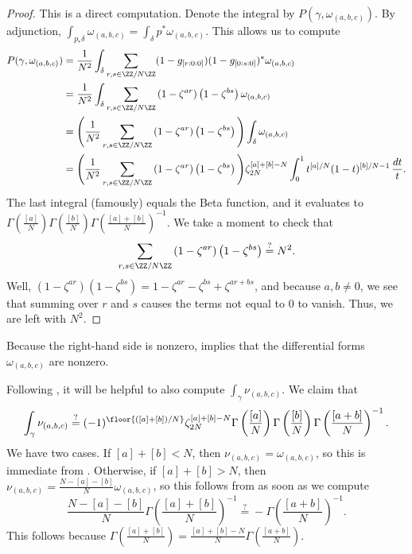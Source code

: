 \documentclass[../thesis.tex]{subfiles}
\begin{document}
\begin{proof}
	This is a direct computation. Denote the integral by $P(\gamma,\omega_{(a,b,c)})$. By adjunction, $\int_{p_*\delta}\omega_{(a,b,c)}=\int_\delta p^*\omega_{(a,b,c)}$. This allows us to compute
	\begin{align*}
		P(\gamma,\omega_{(a,b,c)}) &= \frac1{N^2}\int_\delta\sum_{r,s\in\ZZ/N\ZZ}(1-g_{[r:0:0]})(1-g_{[0:s:0]})^*\omega_{(a,b,c)} \\
		&= \frac1{N^2}\int_\delta\sum_{r,s\in\ZZ/N\ZZ}\left(1-\zeta^{ar}\right)\left(1-\zeta^{bs}\right)\omega_{(a,b,c)} \\
		&= \Bigg(\frac1{N^2}\sum_{r,s\in\ZZ/N\ZZ}\left(1-\zeta^{ar}\right)\left(1-\zeta^{bs}\right)\Bigg)\int_\delta\omega_{(a,b,c)} \\
		&= \Bigg(\frac1{N^2}\sum_{r,s\in\ZZ/N\ZZ}\left(1-\zeta^{ar}\right)\left(1-\zeta^{bs}\right)\Bigg)\zeta_{2N}^{[a]+[b]-N}\int_0^1t^{[a]/N}(1-t)^{[b]/N-1}\,\frac{dt}t.
	\end{align*}
	The last integral (famously) equals the Beta function, and it evaluates to $\Gamma\left(\frac{[a]}N\right)\Gamma\left(\frac{[b]}N\right)\Gamma\left(\frac{[a]+[b]}N\right)^{-1}$. We take a moment to check that
	\[\sum_{r,s\in\ZZ/N\ZZ}\left(1-\zeta^{ar}\right)\left(1-\zeta^{bs}\right)\stackrel?=N^2.\]
	Well, $\left(1-\zeta^{ar}\right)\left(1-\zeta^{bs}\right)=1-\zeta^{ar}-\zeta^{bs}+\zeta^{ar+bs}$, and because $a,b\ne0$, we see that summing over $r$ and $s$ causes the terms not equal to $0$ to vanish. Thus, we are left with $N^2$.
\end{proof}
\begin{remark} \label{rem:nonzero-form-period}
	Because the right-hand side is nonzero,  implies that the differential forms $\omega_{(a,b,c)}$ are nonzero.
\end{remark}
\begin{remark} \label{rem:coleman-periods}
	Following , it will be helpful to also compute $\int_\gamma\nu_{(a,b,c)}$. We claim that
	\[\int_\gamma\nu_{(a,b,c)}\stackrel?=(-1)^{\floor{([a]+[b])/N}}\zeta_{2N}^{[a]+[b]-N}\Gamma\left(\frac{[a]}N\right)\Gamma\left(\frac{[b]}N\right)\Gamma\left(\frac{[a+b]}N\right)^{-1}.\]
	We have two cases. If $[a]+[b]<N$, then $\nu_{(a,b,c)}=\omega_{(a,b,c)}$, so this is immediate from . Otherwise, if $[a]+[b]>N$, then $\nu_{(a,b,c)}=\frac{N-[a]-[b]}{N}\omega_{(a,b,c)}$, so this follows from  as soon as we compute
	\[\frac{N-[a]-[b]}{N}\Gamma\left(\frac{[a]+[b]}N\right)^{-1}\stackrel?=-\Gamma\left(\frac{[a+b]}N\right)^{-1}.\]
	This follows because $\Gamma\left(\frac{[a]+[b]}N\right)=\frac{[a]+[b]-N}N\Gamma\left(\frac{[a+b]}N\right)$.
\end{remark}
\end{document}
